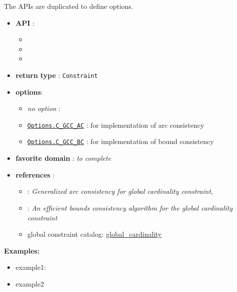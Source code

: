 The APIs are duplicated to define options. 

\begin{itemize}
	\item \textbf{API} :
      \begin{itemize}
	\item {}
	\item {}
	\item {}
      \end{itemize}
	\item \textbf{return type} : \texttt{Constraint}
	\item \textbf{options}:
	\begin{itemize}
		\item \emph{no option} :
		\item \hyperlink{cgccac:cgccacoptions}{\tt Options.C\_GCC\_AC} : for \cite{ReginAAAI96} implementation of arc consistency
		\item \hyperlink{cgccbc:cgccbcoptions}{\tt Options.C\_GCC\_BC} : for  \cite{QuimperCP03} implementation of bound consistency
	\end{itemize}
	\item \textbf{favorite domain} : \emph{to complete}
	\item \textbf{references} :
      \begin{itemize}
      \item \cite{ReginAAAI96}: \emph{Generalized arc consistency for global cardinality constraint},
      \item \cite{QuimperCP03}: \emph{An efficient bounds consistency algorithm for the global cardinality constraint}
      \item global constraint catalog: \href{http://www.emn.fr/x-info/sdemasse/gccat/Cglobal_cardinality.html}{global\_cardinality}
      \end{itemize}
\end{itemize}

\textbf{Examples:}
\begin{itemize}
	\item example1:
\end{itemize}



\begin{itemize}
	\item example2
\end{itemize}


